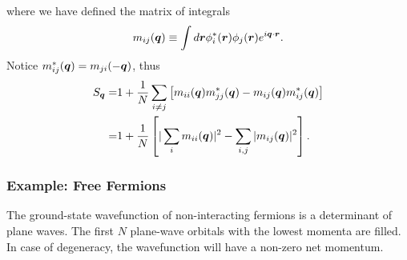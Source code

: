 where we have defined the matrix of integrals
\begin{align}
m_{ij}(\boldsymbol{q}) \equiv \int d\boldsymbol{r} \phi_i^*(\boldsymbol{r}) \phi_j(\boldsymbol{r}) e^{i\boldsymbol{q}\cdot\boldsymbol{r}}. \label{eq:det-mijq}
\end{align}
Notice $m_{ij}^*(\boldsymbol{q}) = m_{ji}(-\boldsymbol{q})$, thus
\begin{align}
S_{\boldsymbol{q}} =& 1+\frac{1}{N} \sum_{i\neq j} \left[ m_{ii}(\boldsymbol{q})m_{jj}^*(\boldsymbol{q}) - m_{ij}(\boldsymbol{q})m_{ij}^*(\boldsymbol{q}) \right] \nonumber \\
=& 1+\frac{1}{N} \left[
\vert \sum_{i} m_{ii}(\boldsymbol{q}) \vert^2 -\sum_{i, j} \vert m_{ij}(\boldsymbol{q}) \vert^2
\right]. \label{eq:det-sofk}
\end{align}

\subsubsection{Example: Free Fermions}
The ground-state wavefunction of non-interacting fermions is a determinant of plane waves. The first $N$ plane-wave orbitals with the lowest momenta are filled. In case of degeneracy, the wavefunction will have a non-zero net momentum. %

